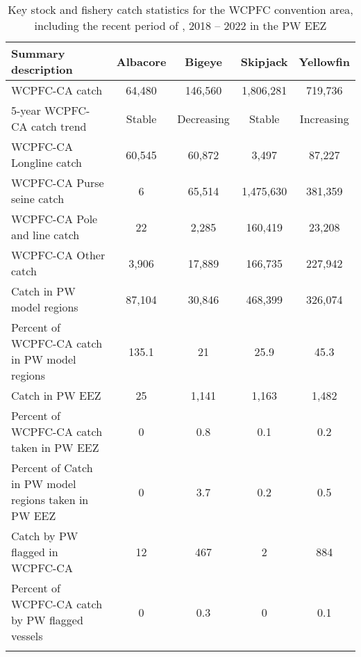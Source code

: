 \begin{longtable}{lcccc}
\caption{Key stock and fishery catch statistics for the WCPFC convention area, including the recent period of , 2018 -- 2022 in the PW EEZ} \\ 
  \hline
Summary description & Albacore & Bigeye & Skipjack & Yellowfin \\ 
  \hline
WCPFC-CA catch & 64,480 & 146,560 & 1,806,281 & 719,736 \\ 
  5-year WCPFC-CA catch trend & Stable & Decreasing & Stable & Increasing \\ 
  WCPFC-CA Longline catch & 60,545 & 60,872 & 3,497 & 87,227 \\ 
  WCPFC-CA Purse seine catch & 6 & 65,514 & 1,475,630 & 381,359 \\ 
  WCPFC-CA Pole and line catch & 22 & 2,285 & 160,419 & 23,208 \\ 
  WCPFC-CA Other catch & 3,906 & 17,889 & 166,735 & 227,942 \\ 
  Catch in PW model regions & 87,104 & 30,846 & 468,399 & 326,074 \\ 
  Percent of WCPFC-CA catch in PW model regions & 135.1 & 21 & 25.9 & 45.3 \\ 
   \hline
Catch in PW EEZ & 25 & 1,141 & 1,163 & 1,482 \\ 
  Percent of WCPFC-CA catch taken in PW EEZ & 0 & 0.8 & 0.1 & 0.2 \\ 
  Percent of Catch in PW model regions taken in PW EEZ & 0 & 3.7 & 0.2 & 0.5 \\ 
  Catch by PW flagged in WCPFC-CA & 12 & 467 & 2 & 884 \\ 
  Percent of WCPFC-CA catch by PW flagged vessels & 0 & 0.3 & 0 & 0.1 \\ 
  \hline
\label{cat_sum_tab}
\end{longtable}
